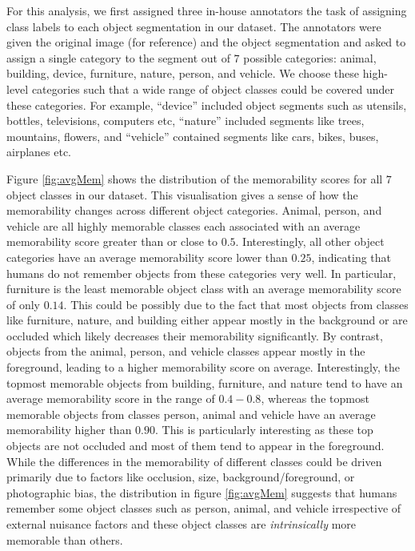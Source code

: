 For this analysis, we first assigned three in-house annotators the task of assigning class labels to each object segmentation in our dataset. The annotators were given the original image (for reference) and the object segmentation and asked to assign a single category to the segment out of $7$ possible categories: animal, building, device, furniture, nature, person, and vehicle. We choose these high-level categories such that a wide range of object classes could be covered under these categories. For example, “device” included object segments such as  utensils, bottles, televisions, computers etc, “nature” included segments like trees, mountains, flowers, and “vehicle” contained segments like cars, bikes, buses, airplanes etc.

Figure \ref{fig:avgMem} shows the distribution of the memorability scores for all $7$ object classes in our dataset. This visualisation gives a sense of how the memorability changes across different object categories. Animal, person, and vehicle are all highly memorable classes each associated with  an average memorability score greater than or close to $0.5$. Interestingly, all other object categories have an average memorability score lower than $0.25$, indicating that humans do not remember objects from these categories very well. In particular, furniture is the least memorable object class with an average memorability score of only $0.14$. This could be possibly due to the fact that most objects from classes like furniture, nature, and building either appear mostly in the background or are occluded which likely decreases their memorability significantly. By contrast, objects from the animal, person, and vehicle classes appear mostly in the foreground, leading to a higher memorability score on average. Interestingly, the topmost memorable objects from building, furniture, and nature tend to have an average memorability score in the range of $0.4 - 0.8$, whereas the topmost memorable objects from classes person, animal and vehicle have an average memorability higher than $0.90$. This is particularly interesting as these top objects are not occluded and most of them tend to appear in the foreground. While the differences in the memorability of different classes could be driven primarily due to factors like occlusion, size, background/foreground, or photographic bias, the distribution in figure \ref{fig:avgMem} suggests that humans remember some object classes such as person, animal, and vehicle irrespective of external nuisance factors and these object classes are \textit{intrinsically} more memorable than others.
